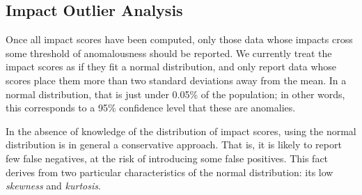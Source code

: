 

\subsection{Impact Outlier Analysis}
\label{sec:outlier_analysis}

Once all impact scores have been computed, only those data whose
impacts cross some threshold of anomalousness should be
reported. We currently treat the impact scores as if they fit a normal
distribution, and only report data whose scores place them more
than two standard deviations away from the mean. In a normal
distribution, that is just under 0.05\% of the population; in other
words, this corresponds to a 95\% confidence level that these are
anomalies.

In the absence of knowledge of the distribution of impact scores, using
the normal distribution is in general a conservative approach. That is, it
is likely to report few false negatives, at the risk of introducing some false
positives. This fact derives from two particular characteristics of the
normal distribution: its low \emph{skewness} and \emph{kurtosis}.

